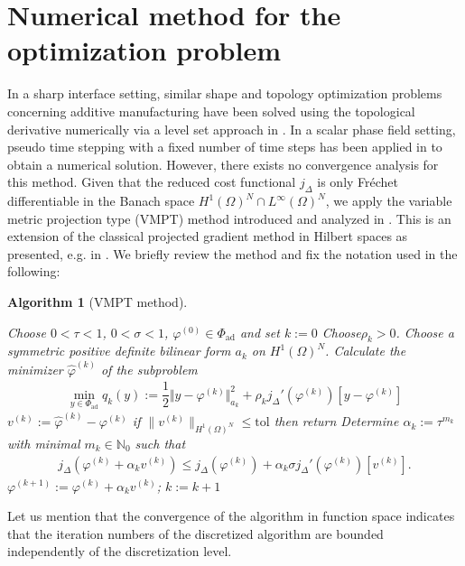 \documentclass[a4paper,11pt]{article}
\newtheorem{algo}[theorem]{Algorithm}
\theoremstyle{remark}
\newcommand{\phik}{\varphi^{(k)}}
\newcommand{\Pad}{\Phi_{\text{ad}}}
\newcommand{\N}{\mathbb{N}}
\newcommand{\HON}{H^1(\Omega)^N }
\newcommand{\LinfN}{L^\infty(\Omega)^N}
\begin{document}
\section{Numerical method for the optimization problem}
\label{sec:VMPT}
In a sharp interface setting, similar shape and topology optimization problems concerning additive manufacturing have been solved using the topological derivative numerically via a level set approach in \cite{AllaireOverview1,AllaireOverview2,Allaire2}. 
%
In a scalar phase field setting, pseudo time stepping with a fixed number of time steps has been applied in \cite{WIAS} to obtain a numerical solution.
However, there exists no convergence analysis for this method.
Given that the reduced cost functional $j_\Delta$ is only Fréchet differentiable in the Banach space $\HON\cap\LinfN$, we apply the variable metric projection type (VMPT) method introduced and analyzed in \cite{VMPT}. 
This is an extension of the classical projected gradient method in Hilbert spaces as presented, e.g. in \cite{Bertsekas,GruverSachs1981,KelleySachs1992}.
We briefly review the method and fix the notation used in the following:
\begin{algo}[VMPT method]\label{algorithm1}
\quad 
\begin{algorithmic}[1]
\STATE Choose $0<\tau < 1$, $0<\sigma<1$, $\varphi^{(0)} \in \Pad$ and set $k := 0$
\STATE Choose$\rho_k> 0 $.
        \STATE Choose a symmetric positive definite bilinear form $a_k$ on
$\HON$.
	\STATE \label{choiceofoverlinevarphi} Calculate the minimizer $\hat \varphi ^{(k)} $
        of the subproblem
\begin{align}
\label{eq:ProjProb}
\min_{y\in\Pad} q_k(y) := \dfrac{1}{2} \Vert y-\phik \Vert^2_{a_k} + \rho_k j_\Delta'(\phik) [ y-\phik ]
\end{align}
	\STATE 
        $v^{(k)} := \hat \varphi ^{(k)} - \phik$
\STATE if  $\| v^{(k)} \|_{\HON} \leq \textrm{tol}$ then return
	\STATE Determine  $\alpha_k:= \tau^{m_k}$ with minimal $m_k\in\N _0$ such that 
\begin{align}
\label{eq:armijo}
j_\Delta(\phik + \alpha_k v^{(k)}) \leq j_\Delta(\phik) + \alpha_k \sigma  j_\Delta'(\phik)[v^{(k)}]  .
\end{align}
	\STATE
        $\varphi^{(k+1)} := \phik + \alpha_k v^{(k)}$; 
	$k:=k+1$
\ENDWHILE
\end{algorithmic}
\end{algo}
Let us mention that the convergence of the algorithm in function space indicates that the iteration numbers of the discretized algorithm are bounded independently of the discretization level.
\end{document}
